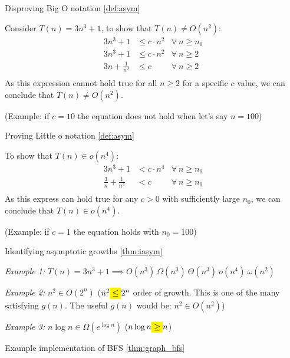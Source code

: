 \begin{example}
    \label{eg:asym_1}
    {Disproving Big O notation} \ref{def:asym}

    Consider $T(n) = 3n^3 + 1$, to show that $T(n) \neq O(n^2)$:
    \begin{align*}
        3n^3 + 1           & \leq c \cdot n^2 & \forall\ n \geq n_0 \\
        3n^3 + 1           & \leq c\cdot n^2  & \forall\ n \geq 2   \\
        3n + \frac{1}{n^2} & \leq c           & \forall\ n \geq 2   \\
    \end{align*}
    As this expression cannot hold true for all $n \geq 2$ for a specific $c$ value, we can conclude that $T(n) \neq O(n^2)$.

    (Example: if $c = 10$ the equation does not hold when let's say $n = 100$)
\end{example}

\begin{example}
    \label{eg:asym_2}
    {Proving Little o notation} \ref{def:asym}

    To show that $T(n) \in o(n^4)$:
    \begin{align*}
        3n^3 + 1                    & < c \cdot n^4 & \forall\ n \geq n_0 \\
        \frac{3}{n} + \frac{1}{n^4} & < c           & \forall\ n \geq n_0 \\
    \end{align*}
    As this express can hold true for any $c > 0$ with sufficiently large $n_0$, we can conclude that $T(n) \in o(n^4)$.

    (Example: if $c = 1$ the equation holds with $n_0 = 100$)
\end{example}

\begin{example}
    \label{eg:iasym_1}
    Identifying asymptotic growths \ref{thm:iasym}

    \textit{Example 1: }$T(n)=3n^3+1\implies O(n^3)\ \Omega(n^3)\ \Theta(n^3)\ o(n^4)\ \omega(n^2)$

    \textit{Example 2: }$n^2 \in O(2^n)$ ($n^2 \mathcolorbox{yellow}{\leq} 2^n$ order of growth. This is one of the many satisfying $g(n)$. The useful $g(n)$ would be: $n^2 \in O(n^2)$)

    \textit{Example 3: }$n\log n \in \Omega(e^{\log n})$  ($n\log n \mathcolorbox{yellow}{\geq} n$)
\end{example}

\begin{example}
    \label{eg:graph_bfs}
    Example implementation of BFS \ref{thm:graph_bfs}
\end{example}
